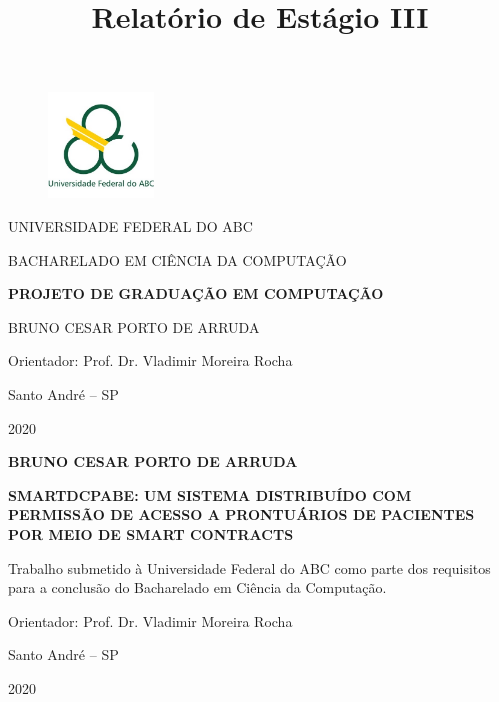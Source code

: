 \documentclass[a4paper,11pt]{article}
\title{Relatório de Estágio III}
\begin{document}


\begin{titlepage}

\begin{figure}
	\label{Logo UFABC}
	\vspace{-1\baselineskip}
	\centering
	\includegraphics[width=0.25\textwidth]{images/Logo_UFABC}
\end{figure}

\uppercase{Universidade Federal do ABC}

\uppercase{Bacharelado em Ciência da Computação}

\vfill
\begin{center}

\uppercase{\textbf{Projeto de Graduação em Computação}}

\vfill

\uppercase{Bruno Cesar Porto de Arruda}
\vspace{1cm}

Orientador: Prof. Dr. Vladimir Moreira Rocha

\vfill

Santo André -- SP

2020
\end{center}
\end{titlepage}



\begin{titlepage}
\begin{center}
\uppercase{\textbf{Bruno Cesar Porto de Arruda}}

\vfill

\uppercase{\textbf{SmartDCPABE: Um sistema distribuído com permissão de acesso a prontuários de pacientes por meio de Smart Contracts}}
\end{center}

\vfill

\hfill \begin{minipage}{0.5\textwidth}
Trabalho submetido à Universidade Federal do ABC como parte dos requisitos para a conclusão do Bacharelado em Ciência da Computação.
\vspace{1cm}

Orientador: Prof. Dr. Vladimir Moreira Rocha
\end{minipage}

\vfill

\begin{center}
Santo André -- SP

2020
\end{center}
\end{titlepage}
\end{document}
